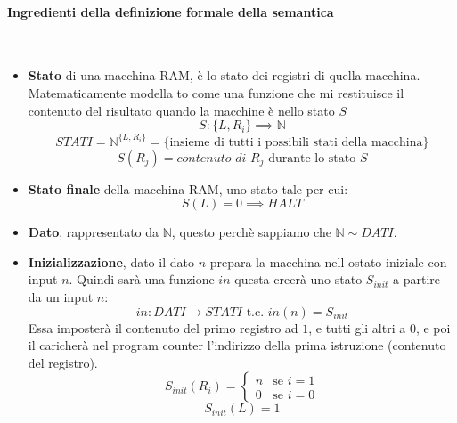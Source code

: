 \documentclass{article}
\begin{document}
\paragraph{Ingredienti della definizione formale della semantica}\mbox{}\\
\begin{itemize}
    \item \textbf{Stato} di una macchina RAM, è lo stato dei registri di quella macchina.
          Matematicamente modella to come una funzione che mi restituisce il contenuto
          del risultato quando la macchine è nello stato $S$
          $$S:\{L, R_i\}\implies\mathbb{N}$$
          $$STATI=\mathbb{N}^{\{L,R_i\}}=\{\text{insieme di tutti i possibili stati della macchina}\}$$
          $$S(R_j) = \textit{contenuto di } R_j\text{ durante lo stato } S$$

    \item \textbf{Stato finale} della macchina RAM, uno stato tale per cui:$$S(L)=0\implies HALT$$
    \item \textbf{Dato}, rappresentato da $\mathbb{N}$, questo perchè sappiamo che $\mathbb{N}\sim DATI$.
    \item \textbf{Inizializzazione}, dato il dato $n$ prepara la macchina nell ostato iniziale
          con input $n$. Quindi sarà una funzione $in$ questa creerà uno stato $S_{init}$ a partire
          da un input $n$:
          $$in:DATI\rightarrow STATI \text{ t.c. } in(n)=S_{init}$$
          Essa imposterà il contenuto del primo registro ad $1$, e tutti gli altri a $0$, e poi
          il caricherà nel program counter l'indirizzo della prima istruzione (contenuto
          del registro).
          \[
              S_{init}(R_i)=
              \begin{cases}
                  n & \text{se } i=1 \\
                  0 & \text{se } i=0
              \end{cases}
          \]
          $$S_{init}(L)=1$$


\end{itemize}
\end{document}

